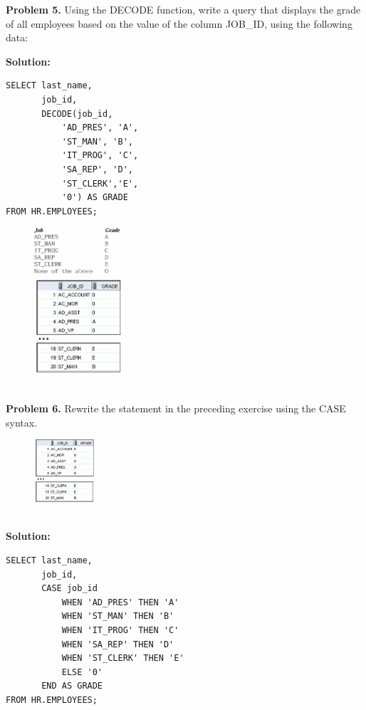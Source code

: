 \documentclass[12pt,a4paper]{article}
\begin{document}
\textbf{Problem 5.} Using the DECODE function, write a query that displays the grade of all employees based on the value of the column JOB\_ID, using the following data:

\textbf{Solution:}
\begin{lstlisting}[style=sqlstyle]
SELECT last_name,
       job_id,
       DECODE(job_id,
           'AD_PRES', 'A',
           'ST_MAN', 'B',
           'IT_PROG', 'C',
           'SA_REP', 'D',
           'ST_CLERK','E',
           '0') AS GRADE
FROM HR.EMPLOYEES;
\end{lstlisting}
\begin{figure}[htbp]
  \centering
  \includegraphics[width=0.3\textwidth]{Screenshots/45.png}
\end{figure}\\


\textbf{Problem 6.} Rewrite the statement in the preceding exercise using the CASE syntax.
\begin{figure}[htbp]
  \centering
  \includegraphics[width=0.2\textwidth]{Screenshots/46.png}
\end{figure}\\
\textbf{Solution:}
\begin{lstlisting}[style=sqlstyle]
SELECT last_name,
       job_id,
       CASE job_id
           WHEN 'AD_PRES' THEN 'A'
           WHEN 'ST_MAN' THEN 'B'
           WHEN 'IT_PROG' THEN 'C'
           WHEN 'SA_REP' THEN 'D'
           WHEN 'ST_CLERK' THEN 'E'
           ELSE '0'
       END AS GRADE
FROM HR.EMPLOYEES;
\end{lstlisting}

\vspace{0.5cm}
\end{document}
